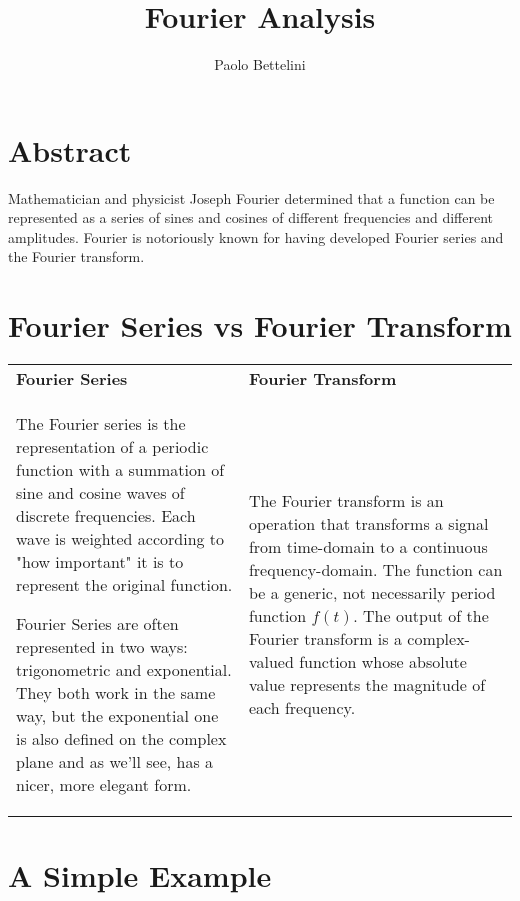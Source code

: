 \documentclass[a4paper]{article}
\title{Fourier Analysis}
\author{Paolo Bettelini}
\date{}
\begin{document}
\maketitle
\tableofcontents
\pagebreak

\section{Abstract}

Mathematician and physicist Joseph Fourier determined that a function can be represented as a series of sines and cosines of different frequencies and different amplitudes.
Fourier is notoriously known for having developed Fourier series and the Fourier transform.

\pagebreak

\section{Fourier Series vs Fourier Transform}

\begin{center}
    \begin{tabular}{ p{8cm}|p{8cm} }
        \textbf{Fourier Series} & \textbf{Fourier Transform} \\
        
        The Fourier series is the representation of a
        periodic function with a summation of sine and
        cosine waves of discrete frequencies.
        Each wave is weighted according to "how important"
        it is to represent the original function.
        
        Fourier Series are often represented in two ways:
        trigonometric and exponential.
        They both work in the same way,
        but the exponential one is also defined on the complex
        plane and as we'll see, has a nicer, more elegant form.
        &
        The Fourier transform is an operation that transforms
        a signal from time-domain to a continuous
        frequency-domain. The function can be a generic,
        not necessarily period function \(f(t)\).
        The output of the Fourier transform is a complex-valued
        function whose absolute value represents the magnitude of each frequency.
    \end{tabular}
\end{center}

\pagebreak

\section{A Simple Example}
\end{document}
